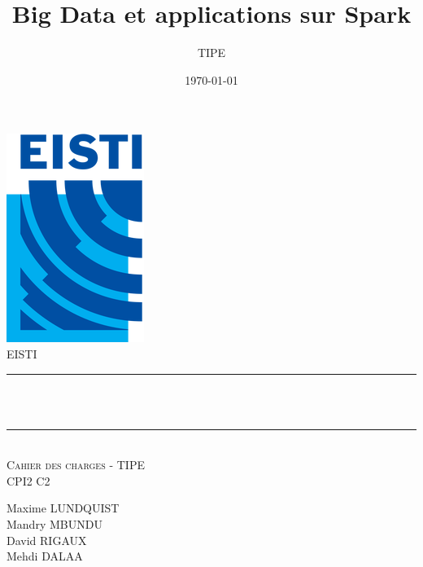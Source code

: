 \documentclass[12pt]{article}
\title{Big Data et applications sur Spark}								%
\author{TIPE}								%
\date{\today}											%
\makeatletter
\let\thetitle\@title
\let\thedate\@date
\makeatother
\begin{document}

\begin{titlepage}
	\centering
    \vspace*{0.5 cm}
    \includegraphics[scale = 0.75 ]{logo1.png}\\[1.0 cm]	%
    \textsc{\LARGE EISTI}\\[2.0 cm]			%
    \rule{\linewidth}{0.2 mm} \\[0.5 cm]
    { \huge \bfseries \thetitle}\\
    \rule{\linewidth}{0.2 mm} \\[1.5 cm]
	\textsc{\Large Cahier des charges - TIPE}\\[0.5 cm]	%
	\textsc{\large CPI2 C2}\\[0.5 cm]		%
	
	\begin{minipage}{0.4\textwidth}
	\centering
		\begin{center} \large
		Maxime LUNDQUIST \\
		Mandry MBUNDU \\
		David RIGAUX \\
		Mehdi DALAA \\
			\end{center}
			\end{minipage}~
			\begin{minipage}{0.4\textwidth}
	\end{minipage}\\[0.8 cm]
	{\large \thedate}\\[1 cm]
	\vfill
	
\end{titlepage}

\end{document}
